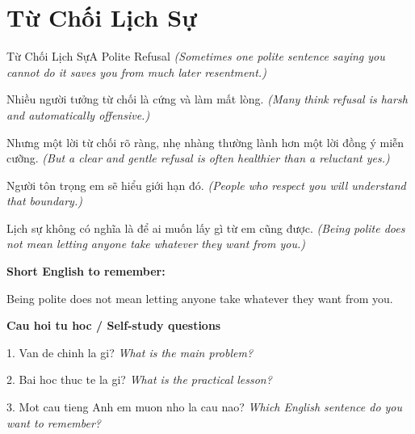 \section{Từ Chối Lịch Sự}
\begin{truyen}{Từ Chối Lịch Sự}{A Polite Refusal}
\textit{(Sometimes one polite sentence saying you cannot do it saves you from much later resentment.)}

Nhiều người tưởng từ chối là cứng và làm mất lòng.
\textit{(Many think refusal is harsh and automatically offensive.)}

Nhưng một lời từ chối rõ ràng, nhẹ nhàng thường lành hơn một lời đồng ý miễn cưỡng.
\textit{(But a clear and gentle refusal is often healthier than a reluctant yes.)}

Người tôn trọng em sẽ hiểu giới hạn đó.
\textit{(People who respect you will understand that boundary.)}

\end{truyen}

\begin{baihoc}
Lịch sự không có nghĩa là để ai muốn lấy gì từ em cũng được.
\textit{(Being polite does not mean letting anyone take whatever they want from you.)}
\end{baihoc}

\begin{ghinhoanh}
\textbf{Short English to remember:}

Being polite does not mean letting anyone take whatever they want from you.

\end{ghinhoanh}

\begin{tuhocnhanh}
\textbf{Cau hoi tu hoc / Self-study questions}

1. Van de chinh la gi? \textit{What is the main problem?}

2. Bai hoc thuc te la gi? \textit{What is the practical lesson?}

3. Mot cau tieng Anh em muon nho la cau nao? \textit{Which English sentence do you want to remember?}
\end{tuhocnhanh}
\ngancach

